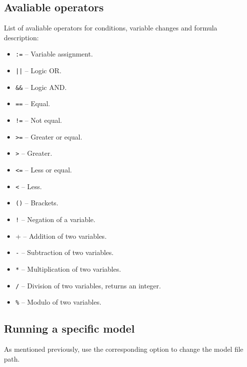 \documentclass[12pt]{article}
\begin{document}
\newpage

\subsection{Avaliable operators}
List of avaliable operators for conditions, variable changes and formula description:
\begin{itemize}
  \item \verb+:=+ -- Variable assignment.
  \item \verb+||+ -- Logic OR.
  \item \verb+&&+ -- Logic AND.
  \item \verb+==+ -- Equal.
  \item \verb+!=+ -- Not equal.
  \item \verb+>=+ -- Greater or equal.
  \item \verb+>+ -- Greater.
  \item \verb+<=+ -- Less or equal.
  \item \verb+<+ -- Less.
  \item \verb+()+ -- Brackets.
  \item \verb+!+ -- Negation of a variable.
  \item \verb+++ -- Addition of two variables.
  \item \verb+-+ -- Subtraction of two variables.
  \item \verb+*+ -- Multiplication of two variables.
  \item \verb+/+ -- Division of two variables, returns an integer.
  \item \verb+%+ -- Modulo of two variables.
\end{itemize}



\subsection{Running a specific model}
As mentioned previously, use the corresponding option to change the model file path.
\end{document}

